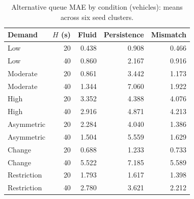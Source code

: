 \begin{table}[t]
\caption{Alternative queue MAE by condition (vehicles): means across six seed clusters.}
\label{tab:sumo-conditions}
\centering
\begin{tabular}{lrrrr}
\toprule
Demand & $H$ (s) & Fluid & Persistence & Mismatch \\
\midrule
Low & 20 & 0.438 & 0.908 & 0.466 \\
Low & 40 & 0.860 & 2.167 & 0.916 \\
Moderate & 20 & 0.861 & 3.442 & 1.173 \\
Moderate & 40 & 1.344 & 7.060 & 1.922 \\
High & 20 & 3.352 & 4.388 & 4.076 \\
High & 40 & 2.916 & 4.871 & 4.213 \\
Asymmetric & 20 & 2.284 & 4.040 & 1.386 \\
Asymmetric & 40 & 1.504 & 5.559 & 1.629 \\
Change & 20 & 0.688 & 1.233 & 0.733 \\
Change & 40 & 5.522 & 7.185 & 5.589 \\
Restriction & 20 & 1.793 & 1.617 & 1.398 \\
Restriction & 40 & 2.780 & 3.621 & 2.212 \\
\bottomrule
\end{tabular}
\end{table}
